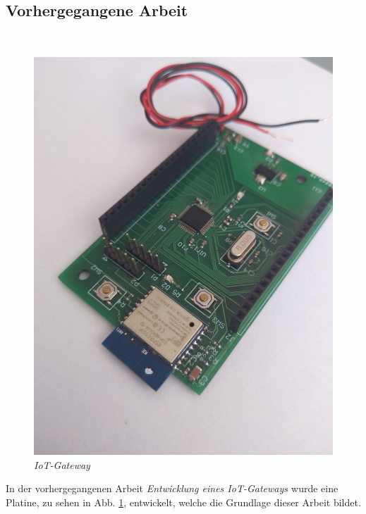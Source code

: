 \subsection{Vorhergegangene Arbeit}

\

\begin{figure}
     \vspace{-\baselineskip}
         \centering
         \includegraphics[scale=0.05]{Pictures/assembled.jpg}
         \caption{\textit{IoT-Gateway \citep{IoTGateway}}}
         \label{img:IoT-Gateway}
 \end{figure}

In der vorhergegangenen Arbeit \textit{Entwicklung eines IoT-Gateways \citep{IoTGateway}} wurde eine Platine, zu sehen in Abb. \ref{img:IoT-Gateway}, 
entwickelt, welche die Grundlage dieser Arbeit bildet. 

